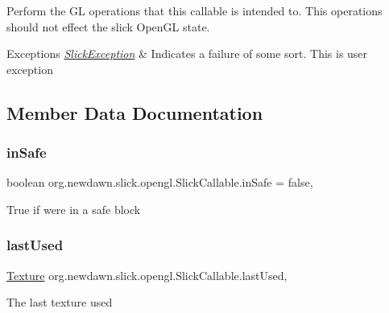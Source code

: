 Perform the GL operations that this callable is intended to. This operations should not effect the slick Open\+GL state.


\begin{DoxyExceptions}{Exceptions}
{\em \mbox{\hyperlink{classorg_1_1newdawn_1_1slick_1_1_slick_exception}{Slick\+Exception}}} & Indicates a failure of some sort. This is user exception \\
\hline
\end{DoxyExceptions}


\subsection{Member Data Documentation}
\mbox{\label{classorg_1_1newdawn_1_1slick_1_1opengl_1_1_slick_callable_a6f60853b128453504f8184a3b6f4e34b}} 
\subsubsection{\texorpdfstring{in\+Safe}{inSafe}}
{\footnotesize\ttfamily boolean org.\+newdawn.\+slick.\+opengl.\+Slick\+Callable.\+in\+Safe = false\hspace{0.3cm}{\ttfamily [static]}, {\ttfamily [private]}}

True if we\textquotesingle{}re in a safe block \mbox{\label{classorg_1_1newdawn_1_1slick_1_1opengl_1_1_slick_callable_a1b9a4b045be62c494829982f9a8671f2}} 
\subsubsection{\texorpdfstring{last\+Used}{lastUsed}}
{\footnotesize\ttfamily \mbox{\hyperlink{interfaceorg_1_1newdawn_1_1slick_1_1opengl_1_1_texture}{Texture}} org.\+newdawn.\+slick.\+opengl.\+Slick\+Callable.\+last\+Used\hspace{0.3cm}{\ttfamily [static]}, {\ttfamily [private]}}

The last texture used 